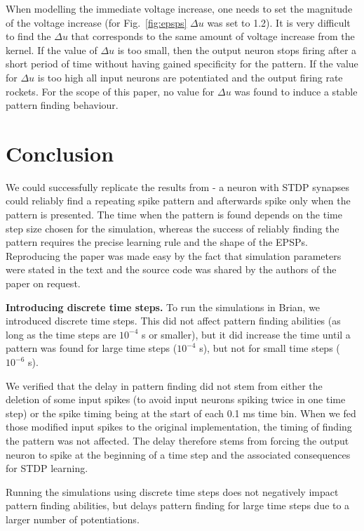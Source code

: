 \documentclass[10pt,a4paper,onecolumn]{article}
\begin{document}
When modelling the immediate voltage increase, one needs to set the
magnitude of the voltage increase (for Fig.~\ref{fig:epsps} \(\Delta u\)
was set to 1.2). It is very difficult to find the \(\Delta u\) that
corresponds to the same amount of voltage increase from the kernel. If
the value of \(\Delta u\) is too small, then the output neuron stops
firing after a short period of time without having gained specificity
for the pattern. If the value for \(\Delta u\) is too high all input
neurons are potentiated and the output firing rate rockets. For the
scope of this paper, no value for \(\Delta u\) was found to induce a
stable pattern finding behaviour.

\section{Conclusion}\label{conclusion}

We could successfully replicate the results from \textcite{Masq2008} - a
neuron with STDP synapses could reliably find a repeating spike pattern
and afterwards spike only when the pattern is presented. The time when
the pattern is found depends on the time step size chosen for the
simulation, whereas the success of reliably finding the pattern requires
the precise learning rule and the shape of the EPSPs. Reproducing the
paper was made easy by the fact that simulation parameters were stated
in the text and the source code was shared by the authors of the paper
on request.

\textbf{Introducing discrete time steps.} To run the simulations in
Brian, we introduced discrete time steps. This did not affect pattern
finding abilities (as long as the time steps are \(10^{-4}\) s or
smaller), but it did increase the time until a pattern was found for
large time steps (\(10^{-4}\) s), but not for small time steps
(\(10^{-6}\) s).

We verified that the delay in pattern finding did not stem from either
the deletion of some input spikes (to avoid input neurons spiking twice
in one time step) or the spike timing being at the start of each 0.1 ms
time bin. When we fed those modified input spikes to the original
implementation, the timing of finding the pattern was not affected. The
delay therefore stems from forcing the output neuron to spike at the
beginning of a time step and the associated consequences for STDP
learning.

Running the simulations using discrete time steps does not negatively
impact pattern finding abilities, but delays pattern finding for large
time steps due to a larger number of potentiations.
\end{document}
